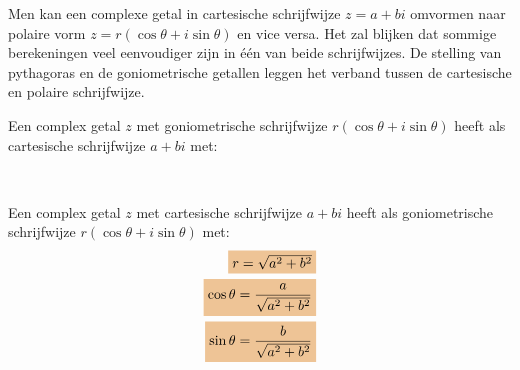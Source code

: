 \documentclass{ximera}
\begin{document}
%
 
 
 

 
 
Men kan een complexe getal in cartesische schrijfwijze $z=a+bi$ omvormen naar polaire vorm $z = r(\cos \theta + i\sin\theta)$ en vice versa. Het zal blijken dat sommige berekeningen veel eenvoudiger zijn in één van beide schrijfwijzes. De stelling van pythagoras en de goniometrische getallen leggen het verband tussen de cartesische en polaire schrijfwijze. 

\begin{proposition}\label{eig:transformatie_complexe_getallen} \nl
     
    Een complex getal $z$ met goniometrische schrijfwijze $r(\cos \theta + i\sin\theta)$ heeft als cartesische schrijfwijze $a+bi$ met:
    \begin{center}
        \\
    \end{center}
    Een complex getal $z$ met cartesische schrijfwijze $a+bi$ heeft als goniometrische schrijfwijze $r(\cos \theta + i\sin\theta)$ met:
    \begin{align*}
    \important{r = \sqrt{a^2+b^2}} \\
    \important{\cos\theta  = \dfrac{a}{\sqrt{a^2+b^2}}}\\
    \important{\sin\theta  = \dfrac{b}{\sqrt{a^2+b^2}}}
    \end{align*}

\end{proposition}
\end{document}
